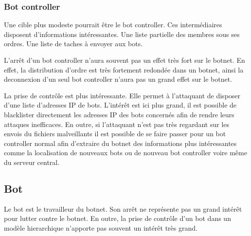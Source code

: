 \subsubsection{Bot controller}

Une cible plus modeste pourrait être le bot controller. Ces intermédiaires disposent d'informations intéressantes. Une liste
partielle des membres sous ses ordres. Une liste de taches à envoyer aux bots.

L'arrêt d'un bot controller n'aura souvent pas un effet très fort sur le botnet. En effet, la distribution d'ordre
est très fortement redondée dans un botnet, ainsi la deconnexion d'un seul bot controller n'aura pas un
grand effet sur le botnet.

La prise de contrôle est plus intéressante. Elle permet à l'attaquant de disposer d'une liste d'adresses IP de
bots. L'intérêt est ici plus grand, il est possible de blacklister directement les adresses IP des bots concernés afin
de rendre leurs attaques inefficaces. En outre, si l'attaquant n'est pas très regardant sur les envois du fichiers malveillants
il est possible de se faire passer pour un bot controller normal afin d'extraire du botnet des informations plus intéressantes comme
la localisation de nouveaux bots ou de nouveau bot controller voire même du serveur central.

\subsection{Bot}

Le bot est le travailleur du botnet. Son arrêt ne représente pas un grand intérêt pour lutter contre le botnet.
En outre, la prise de contrôle d'un bot dans un modèle hierarchique n'apporte pas souvent un intérêt très grand.

